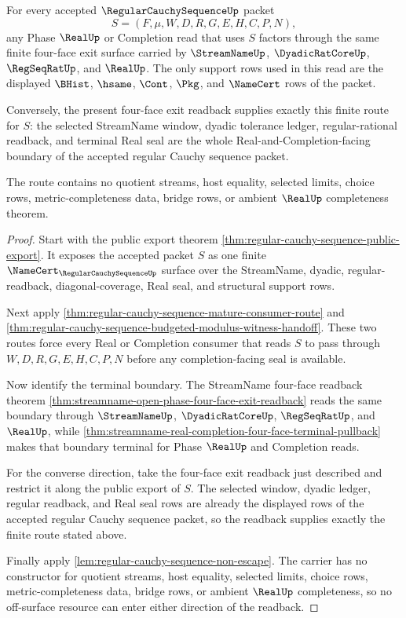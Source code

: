 \begin{theorem}
\label{thm:regular-cauchy-sequence-real-four-face-exit-readback}
For every accepted $\RegularCauchySequenceUp$ packet
$$
S=(F,\mu,W,D,R,G,E,H,C,P,N),
$$
any Phase $\RealUp$ or Completion read that uses $S$ factors through the same finite four-face exit surface carried by $\StreamNameUp$, $\DyadicRatCoreUp$, $\RegSeqRatUp$, and $\RealUp$. The only support rows used in this read are the displayed $\BHist$, $\hsame$, $\Cont$, $\Pkg$, and $\NameCert$ rows of the packet.

Conversely, the present four-face exit readback supplies exactly this finite route for $S$: the selected StreamName window, dyadic tolerance ledger, regular-rational readback, and terminal Real seal are the whole Real-and-Completion-facing boundary of the accepted regular Cauchy sequence packet.

The route contains no quotient streams, host equality, selected limits, choice rows, metric-completeness data, bridge rows, or ambient $\RealUp$ completeness theorem.
\end{theorem}
\begin{proof}
Start with the public export theorem \autoref{thm:regular-cauchy-sequence-public-export}. It exposes the accepted packet $S$ as one finite $\NameCert_{\RegularCauchySequenceUp}$ surface over the StreamName, dyadic, regular-readback, diagonal-coverage, Real seal, and structural support rows.

Next apply \autoref{thm:regular-cauchy-sequence-mature-consumer-route} and \autoref{thm:regular-cauchy-sequence-budgeted-modulus-witness-handoff}. These two routes force every Real or Completion consumer that reads $S$ to pass through $W,D,R,G,E,H,C,P,N$ before any completion-facing seal is available.

Now identify the terminal boundary. The StreamName four-face readback theorem \autoref{thm:streamname-open-phase-four-face-exit-readback} reads the same boundary through $\StreamNameUp$, $\DyadicRatCoreUp$, $\RegSeqRatUp$, and $\RealUp$, while \autoref{thm:streamname-real-completion-four-face-terminal-pullback} makes that boundary terminal for Phase $\RealUp$ and Completion reads.

For the converse direction, take the four-face exit readback just described and restrict it along the public export of $S$. The selected window, dyadic ledger, regular readback, and Real seal rows are already the displayed rows of the accepted regular Cauchy sequence packet, so the readback supplies exactly the finite route stated above.

Finally apply \autoref{lem:regular-cauchy-sequence-non-escape}. The carrier has no constructor for quotient streams, host equality, selected limits, choice rows, metric-completeness data, bridge rows, or ambient $\RealUp$ completeness, so no off-surface resource can enter either direction of the readback.
\end{proof}

